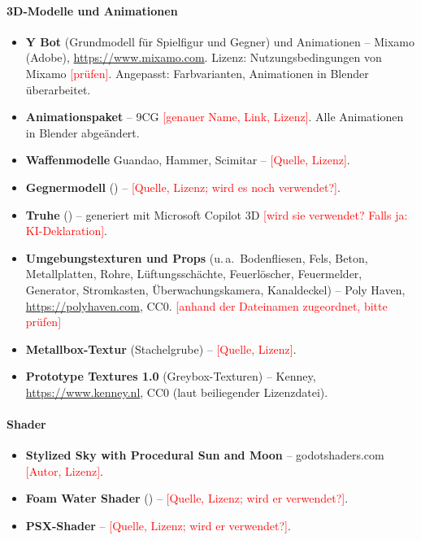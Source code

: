 \documentclass[../Main.tex]{subfiles}
\begin{document}
\paragraph{3D-Modelle und Animationen}
\begin{itemize}[leftmargin=1.5cm]
    \item \textbf{Y Bot} (Grundmodell für Spielfigur und Gegner) und Animationen -- Mixamo (Adobe), \url{https://www.mixamo.com}. Lizenz: Nutzungsbedingungen von Mixamo \textcolor{red}{[prüfen]}. Angepasst: Farbvarianten, Animationen in Blender überarbeitet.
    \item \textbf{Animationspaket} -- 9CG \textcolor{red}{[genauer Name, Link, Lizenz]}. Alle Animationen in Blender abgeändert.
    \item \textbf{Waffenmodelle} Guandao, Hammer, Scimitar -- \textcolor{red}{[Quelle, Lizenz]}.
    \item \textbf{Gegnermodell} () -- \textcolor{red}{[Quelle, Lizenz; wird es noch verwendet?]}.
    \item \textbf{Truhe} () -- generiert mit Microsoft Copilot 3D \textcolor{red}{[wird sie verwendet? Falls ja: KI-Deklaration]}.
    \item \textbf{Umgebungstexturen und Props} (u.\,a.\ Bodenfliesen, Fels, Beton, Metallplatten, Rohre, Lüftungsschächte, Feuerlöscher, Feuermelder, Generator, Stromkasten, Überwachungskamera, Kanaldeckel) -- Poly Haven, \url{https://polyhaven.com}, CC0. \textcolor{red}{[anhand der Dateinamen zugeordnet, bitte prüfen]}
    \item \textbf{Metallbox-Textur} (Stachelgrube) -- \textcolor{red}{[Quelle, Lizenz]}.
    \item \textbf{Prototype Textures 1.0} (Greybox-Texturen) -- Kenney, \url{https://www.kenney.nl}, CC0 (laut beiliegender Lizenzdatei).
\end{itemize}

\paragraph{Shader}
\begin{itemize}[leftmargin=1.5cm]
    \item \textbf{Stylized Sky with Procedural Sun and Moon} -- godotshaders.com \textcolor{red}{[Autor, Lizenz]}.
    \item \textbf{Foam Water Shader} () -- \textcolor{red}{[Quelle, Lizenz; wird er verwendet?]}.
    \item \textbf{PSX-Shader} -- \textcolor{red}{[Quelle, Lizenz; wird er verwendet?]}.
\end{itemize}
\end{document}
